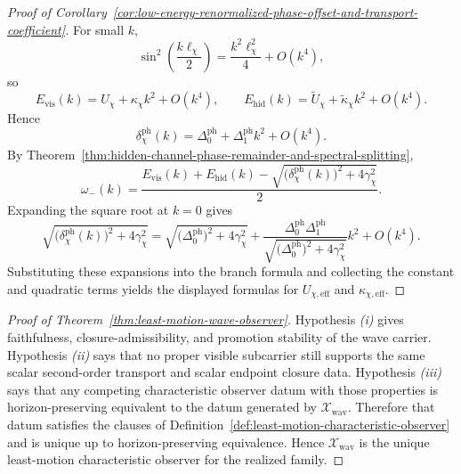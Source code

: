 \begin{proof}[Proof of Corollary~\ref{cor:low-energy-renormalized-phase-offset-and-transport-coefficient}]
\label{proof:cor:low-energy-renormalized-phase-offset-and-transport-coefficient}
For small \(k\),
\[
\sin^2\!\left(\frac{k\ell_{\chi}}{2}\right)
=
\frac{k^2\ell_{\chi}^2}{4}+O(k^4),
\]
so
\[
E_{\mathrm{vis}}(k)
=
U_{\chi}+\kappa_{\chi}k^2+O(k^4),
\qquad
E_{\mathrm{hid}}(k)
=
\widetilde U_{\chi}+\widetilde\kappa_{\chi}k^2+O(k^4).
\]
Hence
\[
\delta_{\chi}^{\mathrm{ph}}(k)
=
\Delta_0^{\mathrm{ph}}+\Delta_1^{\mathrm{ph}}k^2+O(k^4).
\]
By
Theorem~\ref{thm:hidden-channel-phase-remainder-and-spectral-splitting},
\[
\omega_-(k)
=
\frac{
E_{\mathrm{vis}}(k)+E_{\mathrm{hid}}(k)
-
\sqrt{
\bigl(\delta_{\chi}^{\mathrm{ph}}(k)\bigr)^2+4\gamma_{\chi}^2
}
}{2}.
\]
Expanding the square root at \(k=0\) gives
\[
\sqrt{
\bigl(\delta_{\chi}^{\mathrm{ph}}(k)\bigr)^2+4\gamma_{\chi}^2
}
=
\sqrt{
\bigl(\Delta_0^{\mathrm{ph}}\bigr)^2+4\gamma_{\chi}^2
}
+
\frac{
\Delta_0^{\mathrm{ph}}\Delta_1^{\mathrm{ph}}
}{
\sqrt{
\bigl(\Delta_0^{\mathrm{ph}}\bigr)^2+4\gamma_{\chi}^2
}
}k^2
+
O(k^4).
\]
Substituting these expansions into the branch formula and collecting the
constant and quadratic terms yields the displayed formulas for
\(U_{\chi,\mathrm{eff}}\) and \(\kappa_{\chi,\mathrm{eff}}\).
\end{proof}


\begin{proof}[Proof of Theorem~\ref{thm:least-motion-wave-observer}]
\label{proof:thm:least-motion-wave-observer}
Hypothesis \emph{(i)} gives faithfulness, closure-admissibility, and promotion
stability of the wave carrier. Hypothesis \emph{(ii)} says that no proper
visible subcarrier still supports the same scalar second-order transport and
scalar endpoint closure data. Hypothesis \emph{(iii)} says that any competing
characteristic observer datum with those properties is horizon-preserving
equivalent to the datum generated by \(\mathcal X_{\mathrm{wav}}\).
Therefore that datum satisfies the clauses of
Definition~\ref{def:least-motion-characteristic-observer} and is unique up to
horizon-preserving equivalence. Hence \(\mathcal X_{\mathrm{wav}}\) is the
unique least-motion characteristic observer for the realized family.
\end{proof}

